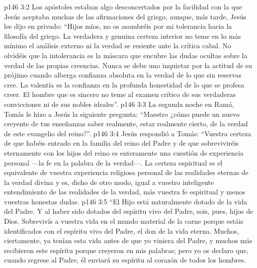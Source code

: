 \vs p146 3:2 Los apóstoles estaban algo desconcertados por la facilidad con la que Jesús aceptaba muchas de las afirmaciones del griego, aunque, más tarde, Jesús les dijo en privado: “Hijos míos, no os asombréis por mi tolerancia hacia la filosofía del griego. La verdadera y genuina certeza interior no teme en lo más mínimo el análisis externo ni la verdad se resiente ante la crítica cabal. No olvidéis que la intolerancia es la máscara que encubre las dudas ocultas sobre la verdad de las propias creencias. Nunca se debe uno inquietar por la actitud de su prójimo cuando alberga confianza absoluta en la verdad de lo que sin reservas cree. La valentía es la confianza en la profunda honestidad de lo que se profesa creer. El hombre que es sincero no teme al examen crítico de sus verdaderas convicciones ni de sus nobles ideales”.
\vs p146 3:3 \pc La segunda noche en Ramá, Tomás le hizo a Jesús la siguiente pregunta: “Maestro ¿cómo puede un nuevo creyente de tus enseñanzas saber realmente, estar realmente cierto, de la verdad de este evangelio del reino?”.
\vs p146 3:4 Jesús respondió a Tomás: “Vuestra certeza de que habéis entrado en la familia del reino del Padre y de que sobreviviréis eternamente con los hijos del reino es enteramente una cuestión de experiencia personal ---la fe en la palabra de la verdad---. La certeza espiritual es el equivalente de vuestra experiencia religiosa personal de las realidades eternas de la verdad divina y es, dicho de otro modo, igual a vuestro inteligente entendimiento de las realidades de la verdad, más vuestra fe espiritual y menos vuestras honestas dudas.
\vs p146 3:5 “El Hijo está naturalmente dotado de la vida del Padre. Y al haber sido dotados del espíritu vivo del Padre, sois, pues, hijos de Dios. Sobrevivís a vuestra vida en el mundo material de la carne porque estáis identificados con el espíritu vivo del Padre, el don de la vida eterna. Muchos, ciertamente, ya tenían esta vida antes de que yo viniera del Padre, y muchos más recibieron este espíritu porque creyeron en mis palabras; pero yo os declaro que, cuando regrese al Padre, él enviará su espíritu al corazón de todos los hombres.
